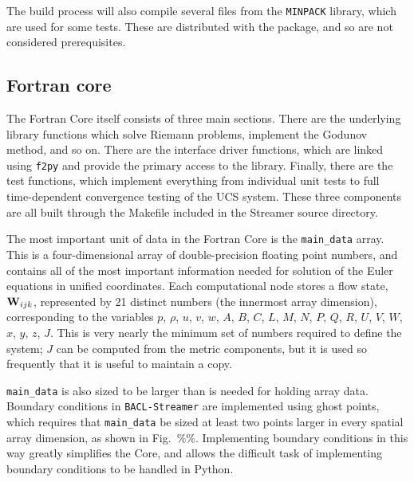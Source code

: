 The build process will also compile several files from the {\tt MINPACK} library, which are used for some tests. These are distributed with the package, and so are not considered prerequisites. 

\subsection{Fortran core}

The Fortran Core itself consists of three main sections. There are the underlying library functions which solve Riemann problems, implement the Godunov method, and so on. There are the interface driver functions, which are linked using {\tt f2py} and provide the primary access to the library. Finally, there are the test functions, which implement everything from individual unit tests to full time-dependent convergence testing of the UCS system. These three components are all built through the Makefile included in the Streamer source directory. 

The most important unit of data in the Fortran Core is the {\tt main\_data} array. This is a four-dimensional array of double-precision floating point numbers, and contains all of the most important information needed for solution of the Euler equations in unified coordinates. Each computational node stores a flow state, 
${{\bf{W}}_{ijk}}$, 
represented by 21 distinct numbers (the innermost array dimension), corresponding to the variables $p$, $\rho$, $u$, $v$, $w$, $A$, $B$, $C$, $L$, $M$, $N$, $P$, $Q$, $R$, $U$, $V$, $W$, $x$, $y$, $z$, $J$. This is very nearly the minimum set of numbers required to define the system; $J$ can be computed from the metric components, but it is used so frequently that it is useful to maintain a copy. 

{\tt main\_data} is also sized to be larger than is needed for holding array data. Boundary conditions in {\tt BACL-Streamer} are implemented using ghost points, which requires that {\tt main\_data} be sized at least two points larger in every spatial array dimension, as shown in Fig.~\%\%. Implementing boundary conditions in this way greatly simplifies the Core, and allows the difficult task of implementing boundary conditions to be handled in Python.

